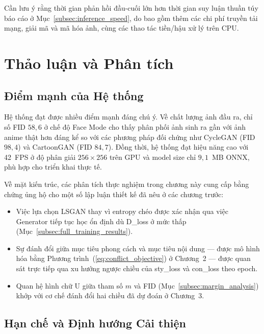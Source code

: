 Cần lưu ý rằng thời gian phản hồi đầu-cuối lớn hơn thời gian suy luận thuần túy báo cáo ở Mục~\ref{subsec:inference_speed}, do bao gồm thêm các chi phí truyền tải mạng, giải mã và mã hóa ảnh, cùng các thao tác tiền/hậu xử lý trên CPU.
\fi

\section{Thảo luận và Phân tích}
\label{sec:discussion}

\subsection{Điểm mạnh của Hệ thống}
\label{subsec:strengths}

Hệ thống đạt được nhiều điểm mạnh đáng chú ý. Về chất lượng ảnh đầu ra, chỉ số FID $58{,}6$ ở chế độ Face Mode cho thấy phân phối ảnh sinh ra gần với ảnh anime thật hơn đáng kể so với các phương pháp đối chứng như CycleGAN (FID $98{,}4$) và CartoonGAN (FID $84{,}7$). Đồng thời, hệ thống đạt hiệu năng cao với 42~FPS ở độ phân giải $256\times256$ trên GPU và model size chỉ $9{,}1$~MB ONNX, phù hợp cho triển khai thực tế.

Về mặt kiến trúc, các phân tích thực nghiệm trong chương này cung cấp bằng chứng ủng hộ cho một số lập luận thiết kế đã nêu ở các chương trước:

\begin{itemize}
    \item Việc lựa chọn LSGAN thay vì entropy chéo được xác nhận qua việc Generator tiếp tục học ổn định dù D\_loss ở mức thấp (Mục~\ref{subsec:full_training_results}).
    \item Sự đánh đổi giữa mục tiêu phong cách và mục tiêu nội dung --- được mô hình hóa bằng Phương trình~(\ref{eq:conflict_objective}) ở Chương~2 --- được quan sát trực tiếp qua xu hướng ngược chiều của sty\_loss và con\_loss theo epoch.
    \item Quan hệ hình chữ U giữa tham số $m$ và FID (Mục~\ref{subsec:margin_analysis}) khớp với cơ chế đánh đổi hai chiều đã dự đoán ở Chương~3.
\end{itemize}

\subsection{Hạn chế và Định hướng Cải thiện}
\label{subsec:limitations}

